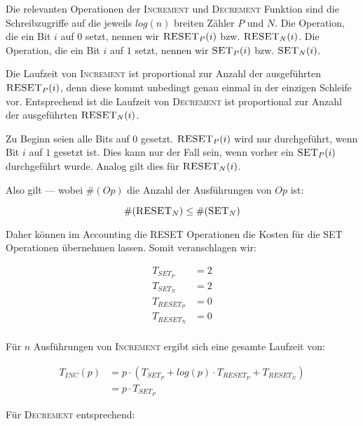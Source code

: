 \documentclass[parskip=half,a4paper]{scrartcl}
\begin{document}
Die relevanten Operationen der \textsc{Increment} und \textsc{Decrement} Funktion sind die Schreibzugriffe auf die jeweils $log(n)$ breiten Zähler $P$ und $N$. Die Operation, die ein Bit $i$ auf $0$ setzt, nennen wir $\textsc{RESET}_P(i)$ bzw. $\textsc{RESET}_N(i)$. Die Operation, die ein Bit $i$ auf $1$ setzt, nennen wir $\textsc{SET}_P(i)$ bzw. $\textsc{SET}_N(i)$.

Die Laufzeit von \textsc{Increment} ist proportional zur Anzahl der ausgeführten $\textsc{RESET}_P(i)$, denn diese kommt unbedingt genau einmal in der einzigen Schleife vor. Entsprechend ist die Laufzeit von \textsc{Decrement} ist proportional zur Anzahl der ausgeführten $\textsc{RESET}_N(i)$.

Zu Beginn seien alle Bits auf $0$ gesetzt. $\textsc{RESET}_P(i)$ wird nur durchgeführt, wenn Bit $i$ auf $1$ gesetzt ist. Dies kann nur der Fall sein, wenn vorher ein $\textsc{SET}_P(i)$ durchgeführt wurde. Analog gilt dies für $\textsc{RESET}_N(i)$.

Also gilt --- wobei $\#(\textit{Op})$ die Anzahl der Ausführungen von $\textit{Op}$ ist:

\begin{equation}
\#(\textsc{RESET}_N) \le \#(\textsc{SET}_N)
\end{equation}

Daher können im Accounting die \textsc{RESET} Operationen die Kosten für die \textsc{SET} Operationen übernehmen lassen. Somit veranschlagen wir:

\begin{equation}
\begin{aligned}
T_{SET_P} &= 2 \\
T_{SET_N} &= 2 \\
T_{RESET_P} &= 0 \\
T_{RESET_N} &= 0 \\
\end{aligned}
\end{equation}

Für $n$ Ausführungen von \textsc{Increment} ergibt sich eine gesamte Laufzeit von:

\begin{equation}
\begin{aligned}
T_{INC}(p) &= p \cdot (T_{SET_P} + log(p) \cdot T_{RESET_P} + T_{RESET_N}) \\
 &= p \cdot T_{SET_P}
\end{aligned}
\end{equation}

Für \textsc{Decrement} entsprechend:
\end{document}

